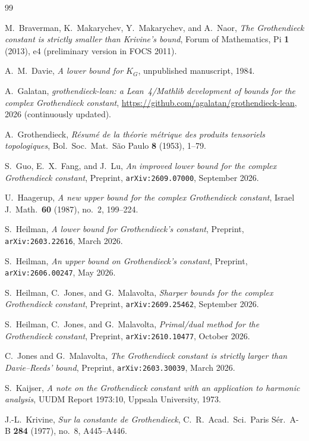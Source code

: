 \documentclass[11pt,reqno]{amsart}
\theoremstyle{definition}
\numberwithin{equation}{section}
\begin{document}
\begin{thebibliography}{99}

M.~Braverman, K.~Makarychev, Y.~Makarychev, and A.~Naor,
\emph{The Grothendieck constant is strictly smaller than Krivine's bound},
Forum of Mathematics, Pi \textbf{1} (2013), e4 (preliminary version in FOCS 2011).

A.~M.~Davie,
\emph{A lower bound for $K_G$},
unpublished manuscript, 1984.

A.~Galatan,
\emph{grothendieck-lean: a Lean~4/Mathlib development of bounds for the complex Grothendieck constant},
\url{https://github.com/agalatan/grothendieck-lean}, 2026 (continuously updated).

A.~Grothendieck,
\emph{R\'esum\'e de la th\'eorie m\'etrique des produits tensoriels topologiques},
Bol.\ Soc.\ Mat.\ S\~ao Paulo \textbf{8} (1953), 1--79.

S.~Guo, E.~X.~Fang, and J.~Lu,
\emph{An improved lower bound for the complex Grothendieck constant},
Preprint, \texttt{arXiv:2609.07000}, September 2026.

U.~Haagerup,
\emph{A new upper bound for the complex Grothendieck constant},
Israel J.\ Math.\ \textbf{60} (1987), no.~2, 199--224.

S.~Heilman,
\emph{A lower bound for Grothendieck's constant},
Preprint, \texttt{arXiv:2603.22616}, March 2026.

S.~Heilman,
\emph{An upper bound on Grothendieck's constant},
Preprint, \texttt{arXiv:2606.00247}, May 2026.

S.~Heilman, C.~Jones, and G.~Malavolta,
\emph{Sharper bounds for the complex Grothendieck constant},
Preprint, \texttt{arXiv:2609.25462}, September 2026.

S.~Heilman, C.~Jones, and G.~Malavolta,
\emph{Primal/dual method for the Grothendieck constant},
Preprint, \texttt{arXiv:2610.10477}, October 2026.

C.~Jones and G.~Malavolta,
\emph{The Grothendieck constant is strictly larger than Davie--Reeds' bound},
Preprint, \texttt{arXiv:2603.30039}, March 2026.

S.~Kaijser,
\emph{A note on the Grothendieck constant with an application to harmonic analysis},
UUDM Report 1973:10, Uppsala University, 1973.

J.-L.~Krivine,
\emph{Sur la constante de Grothendieck},
C.~R.\ Acad.\ Sci.\ Paris S\'er.\ A-B \textbf{284} (1977), no.~8, A445--A446.


\end{thebibliography}
\end{document}
